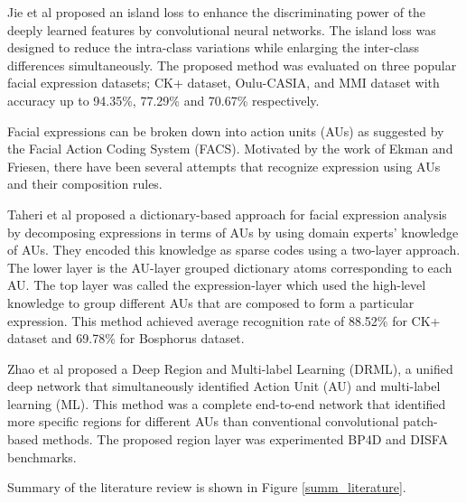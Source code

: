 \documentclass[master]{thesis-uestc}
\begin{document}
Jie et al\cite{8373844} proposed an island loss to enhance the discriminating power of the deeply learned features by convolutional neural networks. The island loss was designed to reduce the intra-class variations while enlarging the inter-class differences simultaneously. The proposed method was evaluated on three popular facial expression datasets; CK+ dataset, Oulu-CASIA, and MMI dataset with accuracy up to 94.35\%, 77.29\% and 70.67\% respectively.

Facial expressions can be broken down into action units (AUs) as suggested by the Facial Action Coding System (FACS). Motivated by the work of Ekman and Friesen\cite{ekman}, there have been several attempts that recognize expression using AUs and their composition rules.

Taheri et al\cite{6837526} proposed a dictionary-based approach for facial expression analysis by decomposing expressions in terms of AUs by using domain experts’ knowledge of AUs. They encoded this knowledge as sparse codes using a two-layer approach. The lower layer is the AU-layer grouped dictionary atoms corresponding to each AU. The top layer was called the expression-layer which used the high-level knowledge to group different AUs that are composed to form a particular expression. This method achieved average recognition rate of 88.52\% for CK+ dataset and 69.78\% for Bosphorus dataset\cite{10.1007/978-3-540-89991-4_6}.

Zhao et al\cite{7780738} proposed a Deep Region and Multi-label Learning (DRML), a unified deep network that simultaneously identified Action Unit (AU) and multi-label learning (ML). This method was a complete end-to-end network that identified more specific regions for different AUs than conventional convolutional patch-based methods. The proposed region layer was experimented BP4D \cite{6553788} and DISFA\cite{10.1007/978-3-642-33783-3_58} benchmarks.

Summary of the literature review is shown in Figure \ref{summ_literature}.
\end{document}
